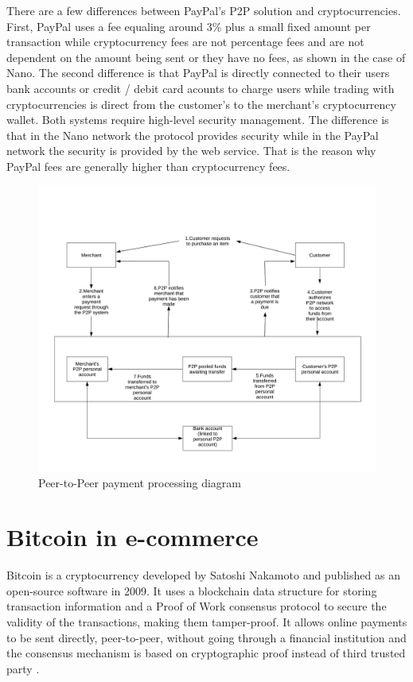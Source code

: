 \documentclass{ferseminar}
\begin{document}
There are a few differences between PayPal's P2P solution and cryptocurrencies. First, PayPal uses a fee equaling around 3\% plus a small fixed amount per transaction while cryptocurrency fees are not percentage fees and are not dependent on the amount being sent or they have no fees, as shown in the case of Nano. The second difference is that PayPal is directly connected to their users bank accounts or credit / debit card acounts to charge users while trading with cryptocurrencies is direct from the customer's to the merchant's cryptocurrency wallet. Both systems require high-level security management. The difference is that in the Nano network the protocol provides security while in the PayPal network the security is provided by the web service. That is the reason why PayPal fees are generally higher than cryptocurrency fees.

\begin{figure}[h!]
	\caption{Peer-to-Peer payment processing diagram}
	\includegraphics[scale=0.215]{diagram3}
	\centering
\end{figure}
\FloatBarrier

\section{Bitcoin in e-commerce}

Bitcoin is a cryptocurrency developed by Satoshi Nakamoto and published as an open-source software in 2009. It uses a blockchain data structure for storing transaction information and a Proof of Work consensus protocol to secure the validity of the transactions, making them tamper-proof. It allows online payments to be sent directly, peer-to-peer, without going through a financial institution and the consensus mechanism is based on cryptographic proof instead of third trusted party \cite{Bitcoin}.
\end{document}
